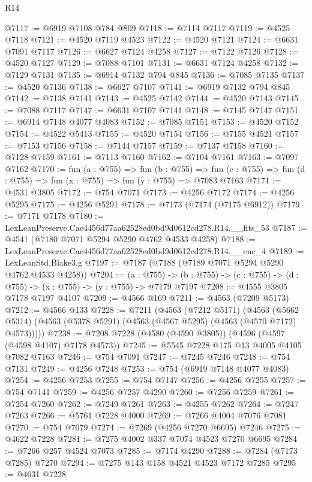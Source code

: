 \begin{lexlean}{R14}
\begin{coremodule}
@7117 := @6919 @7108 @784 @809
@7118 := @7114 @7117
@7119 := @4525 @7118
@7121 := @4520 @7119 @4523
@7122 := @4520 @7121
@7124 := @6631 @7091 @7117
@7126 := @6627 @7124 @4258
@7127 := @7122 @7126
@7128 := @4520 @7127
@7129 := @7088 @7101
@7131 := @6631 @7124 @4258
@7132 := @7129 @7131
@7135 := @6914 @7132 @794 @845
@7136 := @7085 @7135
@7137 := @4520 @7136
@7138 := @6627 @7107
@7141 := @6919 @7132 @794 @845
@7142 := @7138 @7141
@7143 := @4525 @7142
@7144 := @4520 @7143
@7145 := @7088 @7117
@7147 := @6631 @7107 @7141
@7148 := @7145 @7147
@7151 := @6914 @7148 @4077 @4083
@7152 := @7085 @7151
@7153 := @4520 @7152
@7154 := @4522 @5413
@7155 := @4520 @7154
@7156 := @7155 @4521
@7157 := @7153 @7156
@7158 := @7144 @7157
@7159 := @7137 @7158
@7160 := @7128 @7159
@7161 := @7113 @7160
@7162 := @7104 @7161
@7163 := @7097 @7162
@7170 := fun (a : @755) =>
  fun (b : @755) =>
  fun (c : @755) => fun (d : @755) => fun (x : @755) => fun (y : @755) => @7083 @7163
@7171 := @4531 @3805
@7172 := @754 @7071
@7173 := @4256 @7172
@7174 := @4256 @5295
@7175 := @4256 @5291
@7178 := @7173 (@7174 (@7175 @6912))
@7179 := @7171 @7178
@7180 := LexLeanPreserve.Cae4456d77aa62528ed0bd9d0612cd278.R14.__fits_53
@7187 := @4541 (@7180 @7071 @5294 @5290 @4762 @4533 @4258)
@7188 := LexLeanPreserve.Cae4456d77aa62528ed0bd9d0612cd278.R14.__enc_4
@7189 := LexLeanStd.Blake3.g
@7197 := @7187 (@7188 (@7189 @7071 @5294 @5290 @4762 @4533 @4258))
@7204 := (a : @755) ->
  (b : @755) -> (c : @755) -> (d : @755) -> (x : @755) -> (y : @755) -> @7179 @7197
@7208 := @4555 @3805 @7178 @7197 @4107
@7209 := @4566 @169
@7211 := @4563 (@7209 @5173)
@7212 := @4566 @133
@7228 := @7211
    (@4563
      (@7212 @5171)
      (@4563 (@5662 @5314) (@4563 (@5378 @5291) (@4563 (@4567 @5295) (@4563 (@4570 @7172) @4573)))))
@7238 := @7208 @7228 (@4580 (@4590 @3805)) (@4596 (@4597 (@4598 @4107) @7178 @4573))
@7245 := @5545 @7228 @175 @13 @4005 @4105 @7082 @7163
@7246 := @754 @7091
@7247 := @7245 @7246
@7248 := @754 @7131
@7249 := @4256 @7248
@7253 := @754 (@6919 @7148 @4077 @4083)
@7254 := @4256 @7253
@7255 := @754 @7147
@7256 := @4256 @7255
@7257 := @754 @7141
@7259 := @4256 @7257 @4290
@7260 := @7256 @7259
@7261 := @7254 @7260
@7262 := @7249 @7261
@7263 := @4255 @7262
@7264 := @7247 @7263
@7266 := @5761 @7228 @4000
@7269 := @7266 @4004 @7076 @7081
@7270 := @754 @7079
@7274 := @7269 (@4256 @7270 @6695) @7246
@7275 := @4622 @7228
@7281 := @7275 @4002 @337 @7074 @4523 @7270 @6695
@7284 := @7266 @257 @4524 @7073
@7285 := @7174 @4290
@7288 := @7284 (@7173 @7285) @7270
@7294 := @7275 @143 @158 @4521 @4523 @7172 @7285
@7295 := @4631 @7228

\end{coremodule}
\end{lexlean}
